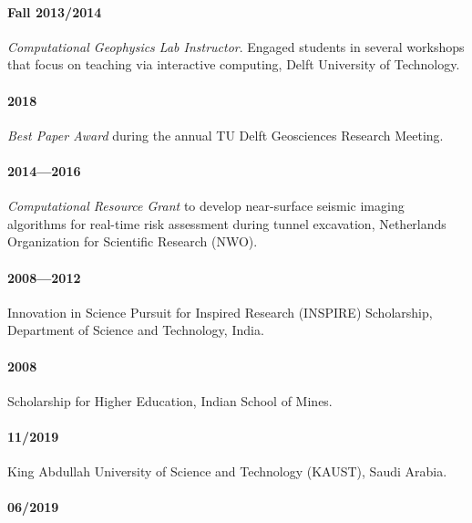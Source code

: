 \documentclass[9pt]{developercv} %
\begin{document}
\paragraph{Fall
2013/2014}\label{fall-20132014}

\emph{Computational
Geophysics
Lab
Instructor}.
Engaged
students
in several
workshops
that focus
on
teaching
via
interactive
computing,
Delft
University
of
Technology.

\label{awards-and-grants}

\paragraph{2018}\label{section-4}

\emph{Best
Paper
Award}
during the
annual TU
Delft
Geosciences
Research
Meeting.

\paragraph{2014---2016}\label{section-5}

\emph{Computational
Resource
Grant} to
develop
near-surface
seismic
imaging
algorithms
for
real-time
risk
assessment
during
tunnel
excavation,
Netherlands
Organization
for
Scientific
Research
(NWO).

\paragraph{2008---2012}\label{section-6}

Innovation
in Science
Pursuit
for
Inspired
Research
(INSPIRE)
Scholarship,
Department
of Science
and
Technology,
India.

\paragraph{2008}\label{section-7}

Scholarship
for Higher
Education,
Indian
School of
Mines.

\label{invited-talks}

\paragraph{11/2019}\label{section-8}

King
Abdullah
University
of Science
and
Technology
(KAUST),
Saudi
Arabia.

\paragraph{06/2019}\label{section-9}
\end{document}
